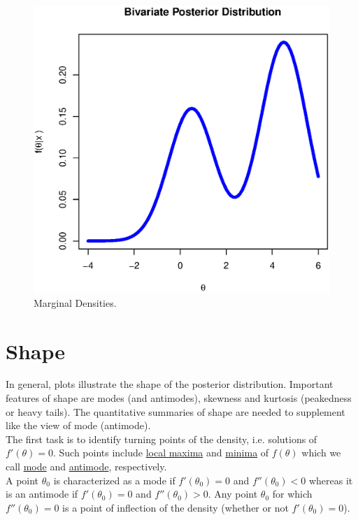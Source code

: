 \documentclass[lecture,12pt,]{pcms-l}
\numberwithin{section}{chapter}
\numberwithin{equation}{chapter}
\theoremstyle{plain}
\theoremstyle{definition}
\theoremstyle{definition}
\begin{document}
\begin{figure}[h!]
 \includegraphics[scale=0.4]{BivarPost}%
  \caption{Marginal Densities. }
\label{fig:posterior}
\end{figure}
\section{Shape}
In general, plots illustrate the shape of the posterior distribution. Important features of shape are modes (and antimodes), skewness and kurtosis (peakedness or heavy tails). The quantitative summaries of shape are needed to supplement like the view of mode (antimode). 
\\
The first task is to identify turning points of the density, i.e. solutions of $f'(\theta)=0$. Such points include \underline{local maxima} and \underline{minima} of $f(\theta)$ which we call \underline{mode} and \underline{antimode}, respectively.
\\
A point $\theta_0$ is characterized as a mode if $f'(\theta_0)=0$ and $f''(\theta_0)<0$ whereas it is an antimode if $f'(\theta_0)=0$ and $f''(\theta_0)>0$. Any point $\theta_0$ for which $f''(\theta_0)=0$ is a point of inflection of the density (whether or not $f'(\theta_0)=0$).
\end{document}
